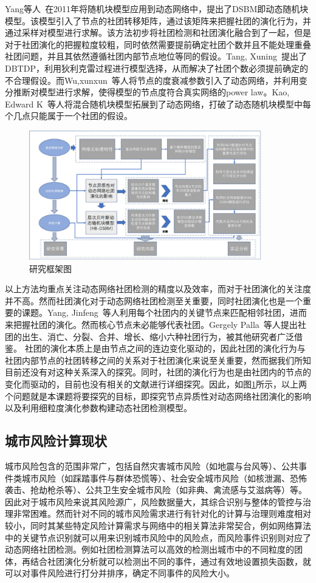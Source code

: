 Yang等人~\cite{yang2011detecting}在2011年将随机块模型应用到动态网络中，提出了DSBM即动态随机块模型。该模型引入了节点的社团转移矩阵，通过该矩阵来把握社团的演化行为，并通过采样对模型进行求解。该方法初步将社团检测和社团演化融合到了一起，但是对于社团演化的把握粒度较粗，同时依然需要提前确定社团个数并且不能处理重叠社团问题，并且其依然遵循社团内部节点地位等同的假设。Tang, Xuning~\cite{tang2011dynamic}提出了DBTDP，利用狄利克雷过程进行模型选择，从而解决了社团个数必须提前确定的不合理假设。而Wu,xunxun~\cite{wu2019dynamic}等人将节点的度衰减参数引入了动态网络，并利用变分推断对模型进行求解，使得模型的节点度符合真实网络的power law。Kao, Edward K~\cite{kao2018hybrid}等人将混合随机块模型拓展到了动态网络，打破了动态随机块模型中每个几点只能属于一个社团的假设。
\begin{figure}[htbp]
	\centering
	\includegraphics[width = 0.9\textwidth]{./figure/framework1.pdf}
	\caption{研究框架图}
	\label{fig.1}
\end{figure}
以上方法均重点关注动态网络社团检测的精度以及效率，而对于社团演化的关注度并不高。然而社团演化对于动态网络社团检测至关重要，同时社团演化也是一个重要的课题。Yang, Jinfeng~\cite{yang2018structural}等人利用每个社团内的关键节点来匹配相邻社团，进而来把握社团的演化。然而核心节点未必能够代表社团。Gergely Palla~\cite{palla2007quantifying}等人提出社团的出生、消亡、分裂、合并、增长、缩小六种社团行为，被其他研究者广泛借鉴。
社团的演化本质上是由节点之间的连边变化驱动的，因此社团的演化行为与社团内部节点的社团转移之间的关系对于社团演化来说至关重要，然而据我们所知目前还没有对这种关系深入的探究。同时，社团的演化行为也是由社团内的节点的变化而驱动的，目前也没有相关的文献进行详细探究。因此，如图\ref{fig.1}所示，以上两个问题就是本课题将要探究的目标，即探究节点异质性对动态网络社团演化的影响以及利用细粒度演化参数构建动态社团检测模型。
\subsection{城市风险计算现状}
城市风险包含的范围非常广，包括自然灾害城市风险（如地震与台风等）、公共事件类城市风险（如踩踏事件与群体恐慌等）、社会安全城市风险（如核泄漏、恐怖袭击、抢劫枪杀等）、公共卫生安全城市风险（如非典、禽流感与艾滋病等）等。因此对于城市风险来说其风险源广，风险数据量大，其综合识别与整体的管控与治理非常困难。然而针对不同的城市风险需求进行有针对化的计算与治理则难度相对较小，同时其某些特定风险计算需求与网络中的相关算法非常契合，例如网络算法中的关键节点识别就可以用来识别城市风险中的风险点，而风险事件识别则对应了动态网络社团检测。例如社团检测算法可以高效的检测出城市中的不同粒度的团体，再结合社团演化分析就可以检测出不同的事件，通过有效地设置损失函数，就可以对事件风险进行打分并排序，确定不同事件的风险大小。


